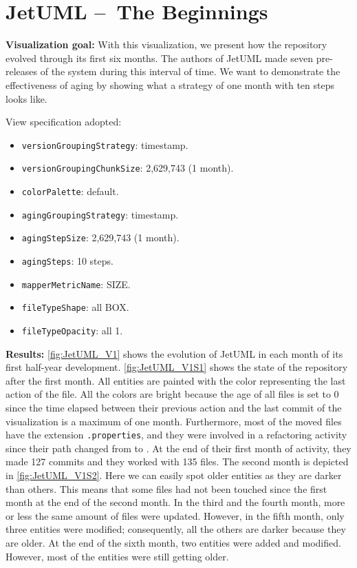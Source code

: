 \clearpage
\section{JetUML – The Beginnings}
\textbf{Visualization goal:}
With this visualization, we present how the repository evolved through its first six months. 
The authors of JetUML made seven pre-releases of the system during this interval of time.
We want to demonstrate the effectiveness of aging by showing what a strategy of one month with ten steps looks like. 


View specification adopted: 
\begin{itemize}
    \item \texttt{versionGroupingStrategy}: timestamp.
    \item \texttt{versionGroupingChunkSize}: 2,629,743 (1 month). 
    \item \texttt{colorPalette}: default.
    \item \texttt{agingGroupingStrategy}: timestamp.
    \item \texttt{agingStepSize}: 2,629,743 (1 month).
    \item \texttt{agingSteps}: 10 steps.
    \item \texttt{mapperMetricName}: SIZE. 
    \item \texttt{fileTypeShape}: all BOX. 
    \item \texttt{fileTypeOpacity}: all 1. 
\end{itemize}

\textbf{Results:}
\autoref{fig:JetUML_V1} shows the evolution of JetUML in each month of its first half-year development. \autoref{fig:JetUML_V1S1} shows the state of the repository after the first month. All entities are painted with the color representing the last action of the file. All the colors are bright because the age of all files is set to 0 since the time elapsed between their previous action and the last commit of the visualization is a maximum of one month. Furthermore, most of the moved files have the extension \texttt{.properties}, and they were involved in a refactoring activity since their path changed from  to .  At the end of their first month of activity, they made 127 commits and they worked with 135 files. The second month is depicted in \autoref{fig:JetUML_V1S2}. Here we can easily spot older entities as they are darker than others. This means that some files had not been touched since the first month at the end of the second month. In the third and the fourth month, more or less the same amount of files were updated. However, in the fifth month, only three entities were modified; consequently, all the others are darker because they are older. 
At the end of the sixth month, two entities were added and modified. However, most of the entities were still getting older. 

